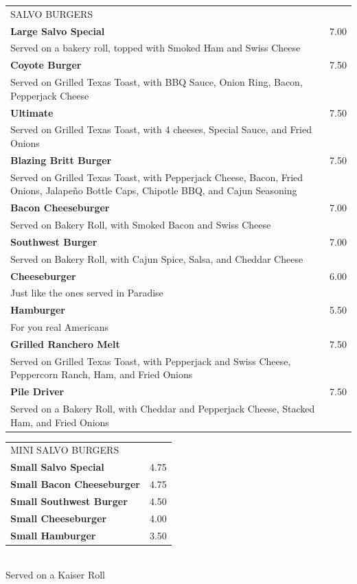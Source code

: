 \documentclass[10pt,notitlepage]{article}
\makeatletter
\newcommand*\ColText[1]{\uppercase{#1}}
\newenvironment{Group}[1]
	{\noindent\begin{tabular*}{\textwidth}{@{}p{.8\linewidth}@{\extracolsep{\fill}}r@{}}
		{\fontsize{16}{20}\selectfont\ColText{#1}}\\[0.8em]}
	{\end{tabular*}}
\newcommand*\Item[2]{%
	\sffamily\textbf{#1}\dotfill & #2}
\newcommand*\Desc[1]{%
	\sffamily\hspace*{1em}\small #1}
\makeatother
\begin{document}
\thispagestyle{first}
	
	\begin{Group}{Salvo Burgers}
		\Item{Large Salvo Special}{7.00} \\
		\Desc{Served on a bakery roll, topped with Smoked Ham and Swiss Cheese} \\
		\Item{Coyote Burger}{7.50} \\
		\Desc{Served on Grilled Texas Toast, with BBQ Sauce, Onion Ring, Bacon, Pepperjack Cheese} \\
		\Item{Ultimate}{7.50} \\
		\Desc{Served on Grilled Texas Toast, with 4 cheeses, Special Sauce, and Fried Onions} \\
		\Item{Blazing Britt Burger}{7.50} \\
		\Desc{Served on Grilled Texas Toast, with Pepperjack Cheese, Bacon, Fried Onions, Jalape\~{n}o Bottle Caps, Chipotle BBQ, and Cajun Seasoning} \\
		\Item{Bacon Cheeseburger}{7.00} \\
		\Desc{Served on Bakery Roll, with Smoked Bacon and Swiss Cheese} \\
		\Item{Southwest Burger}{7.00} \\
		\Desc{Served on Bakery Roll, with Cajun Spice, Salsa, and Cheddar Cheese} \\
		\Item{Cheeseburger}{6.00} \\
		\Desc{Just like the ones served in Paradise} \\
		\Item{Hamburger}{5.50} \\
		\Desc{For you real Americans} \\
		\Item{Grilled Ranchero Melt}{7.50} \\
		\Desc{Served on Grilled Texas Toast, with Pepperjack and Swiss Cheese, Peppercorn Ranch, Ham, and Fried Onions} \\
		\Item{Pile Driver}{7.50} \\
		\Desc{Served on a Bakery Roll, with Cheddar and Pepperjack Cheese, Stacked Ham, and Fried Onions} \\
	\end{Group}
	
	\vfill{}
	
	\begin{Group}{Mini Salvo Burgers}
		\Item{Small Salvo Special}{4.75} \\
		\Item{Small Bacon Cheeseburger}{4.75} \\
		\Item{Small Southwest Burger}{4.50} \\
		\Item{Small Cheeseburger}{4.00} \\
		\Item{Small Hamburger}{3.50} \\
	\end{Group}
	\\[\baselineskip]
	\centering Served on a Kaiser Roll \\
	
\end{document}
